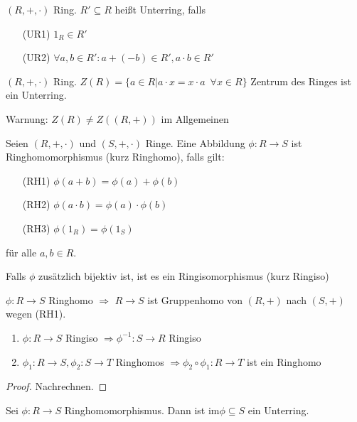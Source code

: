 \documentclass[12pt,a4paper]{scrartcl}
\begin{document}
\begin{defi}
	$(R,+,\cdot)$ Ring. $R'\subseteq R$ heißt Unterring, falls
	\begin{itemize}
		\item[(UR1)] $1_R\in R'$
		\item[(UR2)] $\forall a, b\in R': a+(-b)\in R', a\cdot b \in R'$
	\end{itemize}
\end{defi}

\begin{bsp}
	$(R,+,\cdot)$ Ring. $Z(R) = \{a\in R|a\cdot x = x\cdot a \enspace \forall x\in R\}$ Zentrum des Ringes ist ein Unterring.
	
	Warnung: $Z(R) \neq Z((R,+))$ im Allgemeinen
\end{bsp}	

\begin{defi}
	Seien $(R,+,\cdot)$ und $(S,+,\cdot)$ Ringe. Eine Abbildung $\phi\colon R\to S$ ist Ringhomomorphismus (kurz Ringhomo), falls gilt:
	\begin{itemize}
		\item[(RH1)] $\phi (a+b) = \phi (a)+\phi(b)$
		\item[(RH2)]$\phi(a\cdot b) = \phi(a)\cdot \phi(b)$
		\item[(RH3)]$\phi(1_R) = \phi(1_S)$
	\end{itemize}
	für alle $a,b\in R$.
	
	Falls $\phi$ zusätzlich bijektiv ist, ist es ein Ringisomorphismus (kurz Ringiso)
\end{defi}

\begin{bem}
	$\phi\colon R\to S$ Ringhomo $\Rightarrow$ $R\to S$ ist Gruppenhomo von $(R,+)$ nach $(S,+)$ wegen (RH1).
\end{bem}

\begin{lem}
	\leavevmode
	\begin{enumerate}
		\item $\phi\colon R\to S$ Ringiso $\Rightarrow \phi^{-1}\colon S\to R$ Ringiso
		\item $\phi_1\colon R\to S, \phi_2\colon S\to T$ Ringhomos $\Rightarrow \phi_2\circ\phi_1\colon R\to T$ ist ein Ringhomo
	\end{enumerate}
\end{lem}
\begin{proof}
	Nachrechnen.
\end{proof}


\begin{lem}
	Sei $\phi\colon R\to S$ Ringhomomorphismus. Dann ist $\text{im}\phi\subseteq S$ ein Unterring.
\end{lem}
\end{document}
